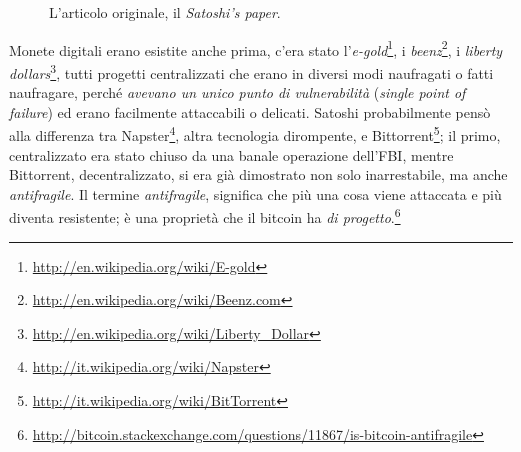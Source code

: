 \documentclass[a4paper,12pt,italian]{article}
\begin{document}
\begin{figure}
\centering
\vspace{-10pt}
\caption{L'articolo originale, il \emph{Satoshi's paper}.}
\end{figure}

\bigskip

Monete digitali erano esistite anche prima, c’era stato
l’\emph{e-gold}\footnote{\url{http://en.wikipedia.org/wiki/E-gold}}, i
\emph{beenz}\footnote{\url{http://en.wikipedia.org/wiki/Beenz.com}}, i \emph{liberty
dollars}\footnote{\url{http://en.wikipedia.org/wiki/Liberty\_Dollar}},
tutti progetti centralizzati che erano in diversi modi naufragati o
fatti naufragare, perché \emph{avevano un unico punto di vulnerabilità}
(\emph{single point of failure}) ed erano facilmente attaccabili o delicati.
Satoshi probabilmente pensò alla differenza tra Napster\footnote{\url{http://it.wikipedia.org/wiki/Napster}},
altra tecnologia dirompente, e Bittorrent\footnote{\url{http://it.wikipedia.org/wiki/BitTorrent}};
il primo, centralizzato era stato
chiuso da una banale operazione dell’FBI, mentre Bittorrent,
decentralizzato, si era già dimostrato non solo inarrestabile, ma anche
\emph{antifragile}. Il termine \emph{antifragile}, significa che più una cosa viene
attaccata e più diventa resistente; è una proprietà che il bitcoin ha \textit{di progetto}.\footnote{
\url{http://bitcoin.stackexchange.com/questions/11867/is-bitcoin-antifragile}}
\end{document}
